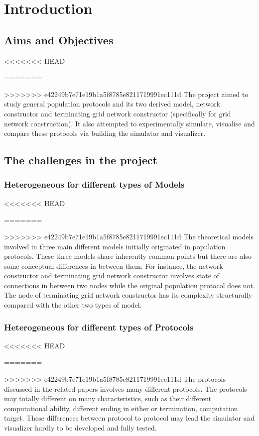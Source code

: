 \section{Introduction}
\subsection{Aims and Objectives}
<<<<<<< HEAD
\par\noindent
=======
\par
>>>>>>> e42249b7e71e19b1a5f8785e8211719991ec111d
The project aimed to study general population protocols \cite{AspnesR2007} and
its two derived model,
network constructor \cite{MS16a} and terminating grid network constructor \cite{Mi17}
(specifically for grid network construction).
It also attempted to experimentally simulate, visualise and compare these protocols
via building the simulator and visualizer.

\subsection{The challenges in the project}
\subsubsection{Heterogeneous for different types of Models}
<<<<<<< HEAD
\par\noindent
=======
\par
>>>>>>> e42249b7e71e19b1a5f8785e8211719991ec111d
The theoretical models involved in three main different models initially originated in
population protocols. These three models share inherently common points but there are also some
conceptual differences in between them. For instance, the network constructor \cite{MS16a} and terminating
grid network constructor \cite{Mi17}
involves state of connections in between two nodes while the original population protocol does not.
The node of terminating grid network constructor has its complexity structurally compared with
the other two types of model.

\subsubsection{Heterogeneous for different types of Protocols}
<<<<<<< HEAD
\par\noindent
=======
\par
>>>>>>> e42249b7e71e19b1a5f8785e8211719991ec111d
The protocols discussed in the related papers \cite{AspnesR2007, MS16a, Mi17} involves
many different protocols. The protocols may totally different on many characteristics,
such as their different computational ability, different ending in either or termination,
computation target. These differences between
protocol to protocol may lead the simulator and visualizer hardly to be developed and
fully tested.

